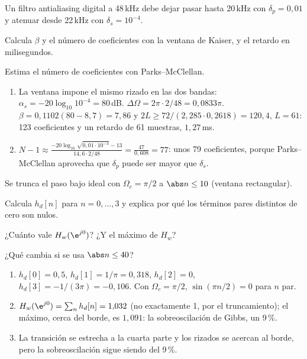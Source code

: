 \documentclass[11pt,a4paper]{scrartcl}
\begin{document}
\begin{ejercicio}
  Un filtro antialiasing digital a 48\,kHz debe dejar pasar hasta 20\,kHz con $\delta_p=0{,}01$ y atenuar desde 22\,kHz con $\delta_s=10^{-4}$.
  \begin{incisos}[1]
    \item Calcula $\beta$ y el número de coeficientes con la ventana de Kaiser, y el retardo en milisegundos.
    \item Estima el número de coeficientes con Parks–McClellan.
  \end{incisos}
\end{ejercicio}
\begin{solucion}
  \begin{enumerate}[label=\alph*)]
    \item La ventana impone el mismo rizado en las dos bandas: $\alpha_s=-20\log_{10}10^{-4}=80$\,dB. $\Delta\Omega=2\pi\cdot2/48=0{,}0833\pi$. $\beta=0{,}1102(80-8{,}7)=7{,}86$ y $2L\ge72/(2{,}285\cdot0{,}2618)=120{,}4$, $L=61$: 123 coeficientes y un retardo de 61 muestras, $1{,}27$\,ms.
    \item $N-1\approx\frac{-20\log_{10}\sqrt{0{,}01\cdot10^{-4}}-13}{14{,}6\cdot2/48}=\frac{47}{0{,}608}=77$: unos 79 coeficientes, porque Parks–McClellan aprovecha que $\delta_p$ puede ser mayor que $\delta_s$.
  \end{enumerate}
\end{solucion}

\begin{ejercicio}
  Se trunca el paso bajo ideal con $\Omega_c=\pi/2$ a $\abs n\le10$ (ventana rectangular).
  \begin{incisos}[1]
    \item Calcula $h_d[n]$ para $n=0,\dots,3$ y explica por qué los términos pares distintos de cero son nulos.
    \item ¿Cuánto vale $H_w(\e^{j0})$? ¿Y el máximo de $H_w$?
    \item ¿Qué cambia si se usa $\abs n\le40$?
  \end{incisos}
\end{ejercicio}
\begin{solucion}
  \begin{enumerate}[label=\alph*)]
    \item $h_d[0]=0{,}5$, $h_d[1]=1/\pi=0{,}318$, $h_d[2]=0$, $h_d[3]=-1/(3\pi)=-0{,}106$. Con $\Omega_c=\pi/2$, $\sin(\pi n/2)=0$ para $n$ par.
    \item $H_w(\e^{j0})=\sum_nh_d[n]=1{,}032$ (no exactamente 1, por el truncamiento); el máximo, cerca del borde, es $1{,}091$: la sobreoscilación de Gibbs, un 9\,\%.
    \item La transición se estrecha a la cuarta parte y los rizados se acercan al borde, pero la sobreoscilación sigue siendo del 9\,\%.
  \end{enumerate}
\end{solucion}
\end{document}
